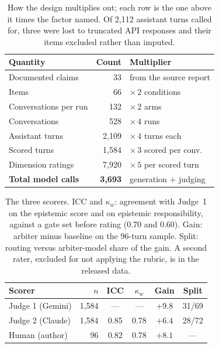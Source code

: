 \documentclass[conference]{IEEEtran}
\newcommand{\rev}[1]{{\color{blue}#1}}
\newcommand{\rev}[1]{#1}
\begin{document}
\begin{table}[!ht]
\caption{How the design multiplies out; each row is the one above it times the
factor named. Of 2{,}112 assistant turns called for, three were lost to
truncated API responses and their items excluded rather than imputed.}
\label{tab:scale}
\centering
\small
\begin{tabular}{lrl}
\toprule
Quantity & Count & Multiplier \\
\midrule
Documented claims        & 33    & from the source report \\
Items                    & 66    & $\times\,2$ conditions \\
Conversations per run    & 132   & $\times\,2$ arms \\
Conversations            & 528   & $\times\,4$ runs \\
\midrule
Assistant turns          & 2{,}109 & $\times\,4$ turns each \\
Scored turns             & 1{,}584 & $\times\,3$ scored per conv. \\
Dimension ratings        & 7{,}920 & $\times\,5$ per scored turn \\
\midrule
\textbf{Total model calls} & \textbf{3{,}693} & generation $+$ judging \\
\bottomrule
\end{tabular}
\end{table}

\begin{table}[!ht]
\caption{\rev{The three scorers. ICC and $\kappa_w$: agreement with Judge~1 on
the epistemic score and on epistemic responsibility, against a gate set before
rating (0.70 and 0.60). Gain: arbiter minus baseline on the 96-turn sample.
Split: routing versus arbiter-model share of the gain. A second rater, excluded
for not applying the rubric, is in the released data.}}
\label{tab:judge}
\centering
\small
\rev{%
\begin{tabular}{lrcccc}
\toprule
Scorer & $n$ & ICC & $\kappa_w$ & Gain & Split \\
\midrule
Judge 1 (Gemini) & 1{,}584 & ---  & ---  & $+9.8$ & 31/69 \\
Judge 2 (Claude) & 1{,}584 & 0.85 & 0.78 & $+6.4$ & 28/72 \\
Human (author)   & 96      & 0.82 & 0.78 & $+8.1$ & ---   \\
\bottomrule
\end{tabular}}
\end{table}
\end{document}
